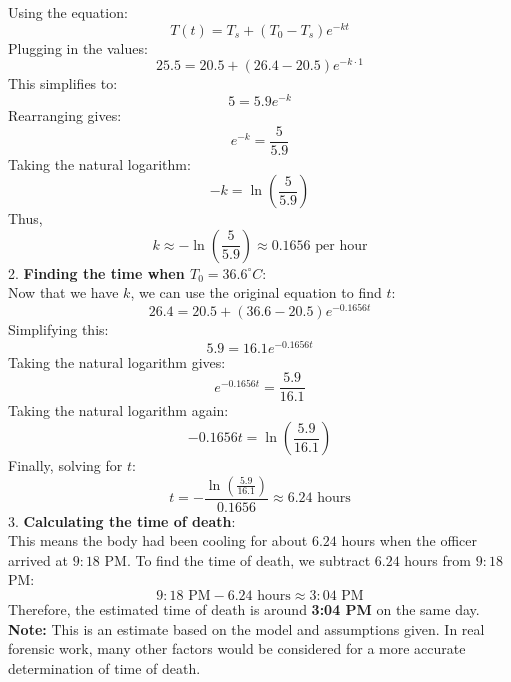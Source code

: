 \documentclass[a4paper, 12pt]{report}
\begin{document}
    Using the equation:
    \[T(t) = T_s + (T_0 - T_s)e^{-kt}\]
    Plugging in the values:
    \[25.5 = 20.5 + (26.4 - 20.5)e^{-k \cdot 1}\]
    This simplifies to:
    \[5 = 5.9e^{-k}\]
    Rearranging gives:
    \[e^{-k} = \frac{5}{5.9}\]
    Taking the natural logarithm:
    \[-k = \ln\left(\frac{5}{5.9}\right)\]
    Thus,
    \[k \approx -\ln\left(\frac{5}{5.9}\right) \approx 0.1656 \text{ per hour}\]
    2. \textbf{Finding the time when \( T_0 = 36.6^\circ C \)}:\\
    Now that we have \( k \), we can use the original equation to find \( t \):
    \[26.4 = 20.5 + (36.6 - 20.5)e^{-0.1656t}\]
    Simplifying this:
    \[5.9 = 16.1e^{-0.1656t}\]
    Taking the natural logarithm gives:
    \[e^{-0.1656t} = \frac{5.9}{16.1}\]
    Taking the natural logarithm again:
    \[-0.1656t = \ln\left(\frac{5.9}{16.1}\right)\]
    Finally, solving for \( t \):
    \[t = -\frac{\ln\left(\frac{5.9}{16.1}\right)}{0.1656} \approx 6.24 \text{ hours}\]
    3. \textbf{Calculating the time of death}:\\
    This means the body had been cooling for about \( 6.24 \) hours when the officer arrived at \( 9:18 \) PM.
    To find the time of death, we subtract \( 6.24 \) hours from \( 9:18 \) PM:
    \[9:18 \text{ PM} - 6.24 \text{ hours} \approx 3:04 \text{ PM}\]
    Therefore, the estimated time of death is around \textbf{3:04 PM} on the same day.\\[1em]
    \textbf{Note:} This is an estimate based on the model and assumptions given. In real forensic work, many other factors would be considered for a more accurate determination of time of death.
\end{document}

